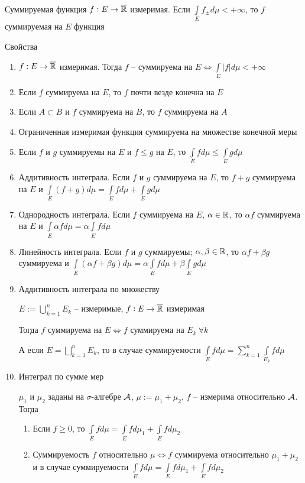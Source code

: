 \documentclass[12pt]{article}
\begin{document}
\begin{defin}{Суммируемая функция}
    $f : E \to \overline{\mathbb R}$ измеримая. Если $\int\limits_E f_\pm d\mu < + \infty$, то $f$ суммируемая на $E$ функция
\end{defin}

\begin{theo}{Свойства}
    \begin{enumerate}
        \item $f : E \to \overline{\mathbb R}$ измеримая. Тогда $f$ -- суммируема на $E \Leftrightarrow \int\limits_E |f|d\mu < + \infty$
        \item Если $f$ суммируема на $E$, то $f$ почти везде конечна на $E$
        \item Если $A \subset B$ и $f$ суммируема на $B$, то $f$ суммируема на $A$ 
        \item Ограниченная измеримая функция суммируема на множестве конечной меры 
        \item Если $f$ и $g$ суммируемы на $E$ и $f \leq g$ на $E$, то $\int\limits_E fd\mu \leq \int\limits_E gd\mu$
        \item Аддитивность интеграла. Если $f$ и $g$ суммируема на $E$, то $f + g$ суммируема на $E$ и $\int\limits_E (f + g)d\mu = \int\limits_E fd\mu + \int\limits_E gd\mu$
        \item Однородность интеграла. Если $f$ суммируема на $E$, $\alpha \in \mathbb R$, то $\alpha f$ суммируема на $E$ и $\int\limits_E \alpha fd\mu = \alpha \int\limits_E fd\mu$
        \item Линейность интеграла. Если $f$ и $g$ суммируемы; $\alpha, \beta \in \mathbb R$, то $\alpha f + \beta g$ суммируема и $\int\limits_E (\alpha f + \beta g)d\mu = \alpha \int\limits_E fd\mu + \beta \int\limits_E gd\mu$
        \item Аддитивность интеграла по множеству
        
        $E := \bigcup\limits_{k = 1}^n E_k$ -- измеримые, $f : E \to \overline{\mathbb R}$ измеримая
        
        Тогда $f$ суммируема на $E \Leftrightarrow f$ суммируема на $E_k\ \forall k$

        А если $E = \bigsqcup\limits_{k = 1}^n E_k$, то в случае суммируемости $\int\limits_E fd\mu = \sum\limits_{k = 1}^n \int\limits_{E_k} fd\mu$
        \item Интеграл по сумме мер
        
        $\mu_1$ и $\mu_2$ заданы на $\sigma$-алгебре $\mathcal{A}$, $\mu := \mu_1 + \mu_2$, $f$ -- измерима относительно $\mathcal{A}$. Тогда 
        
        \begin{enumerate}
            \item Если $f \geq 0$, то $\int\limits_E fd\mu = \int\limits_E fd\mu_1 + \int\limits_E fd\mu_2$
            \item Суммируемость $f$ относительно $\mu \Leftrightarrow f$ суммируема относительно $\mu_1 + \mu_2$ и в случае суммируемости $\int\limits_E fd\mu = \int\limits_E fd\mu_1 + \int\limits_E fd\mu_2$
        \end{enumerate}
    \end{enumerate}
\end{theo}
\end{document}

